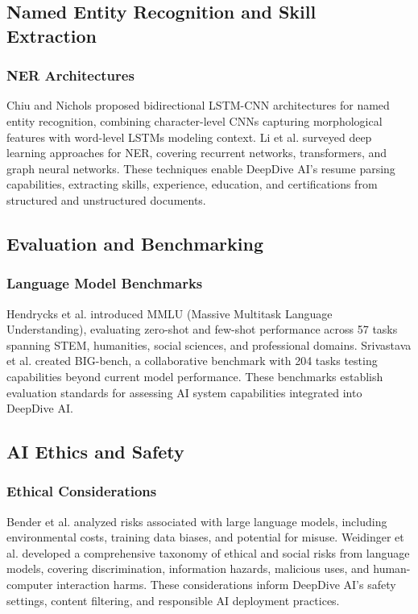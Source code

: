 \documentclass[conference]{IEEEtran}
\begin{document}
\subsection{Named Entity Recognition and Skill Extraction}

\subsubsection{NER Architectures}
Chiu and Nichols \cite{ref36} proposed bidirectional LSTM-CNN architectures for named entity recognition, combining character-level CNNs capturing morphological features with word-level LSTMs modeling context. Li et al. \cite{ref37} surveyed deep learning approaches for NER, covering recurrent networks, transformers, and graph neural networks. These techniques enable DeepDive AI's resume parsing capabilities, extracting skills, experience, education, and certifications from structured and unstructured documents.

\subsection{Evaluation and Benchmarking}

\subsubsection{Language Model Benchmarks}
Hendrycks et al. \cite{ref38} introduced MMLU (Massive Multitask Language Understanding), evaluating zero-shot and few-shot performance across 57 tasks spanning STEM, humanities, social sciences, and professional domains. Srivastava et al. \cite{ref39} created BIG-bench, a collaborative benchmark with 204 tasks testing capabilities beyond current model performance. These benchmarks establish evaluation standards for assessing AI system capabilities integrated into DeepDive AI.

\subsection{AI Ethics and Safety}

\subsubsection{Ethical Considerations}
Bender et al. \cite{ref40} analyzed risks associated with large language models, including environmental costs, training data biases, and potential for misuse. Weidinger et al. \cite{ref41} developed a comprehensive taxonomy of ethical and social risks from language models, covering discrimination, information hazards, malicious uses, and human-computer interaction harms. These considerations inform DeepDive AI's safety settings, content filtering, and responsible AI deployment practices.
\end{document}
